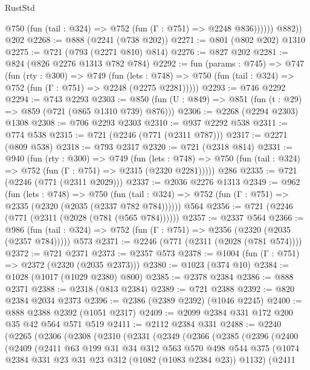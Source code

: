 \begin{lexlean}{RustStd}
\begin{coremodule}
{\begin{coremodule}
{{{{{{{{{{              @750 (fun (tail : @324) => @752 (fun (Γ : @751) => @2248 @836))))))
        @882))
    @202
@2268 := @888 (@2241 (@738 @202))
@2271 := @801 (@802 @202) @1310
@2275 := @721 (@793 (@2271 @810) @814)
@2276 := @827 @202
@2281 := @824 (@826 @2276 @1313 @782 @784)
@2292 := fun (params : @745) =>
  @747
    (fun (rty : @300) =>
    @749
      (fun (lets : @748) =>
      @750 (fun (tail : @324) => @752 (fun (Γ : @751) => @2248 (@2275 @2281)))))
@2293 := @746 @2292
@2294 := @743 @2293
@2303 := @850 (fun (U : @849) => @851 (fun (t : @29) => @859 (@721 (@865 @1310 @739) @876)))
@2306 := @2268 (@2294 @2303) @1308
@2308 := @706 @2293 @2303
@2310 := @937 @2292 @538
@2311 := @774 @538
@2315 := @721 (@2246 (@771 (@2311 @787)))
@2317 := @2271 (@809 @538)
@2318 := @793 @2317
@2320 := @721 (@2318 @814)
@2331 := @940
    (fun (rty : @300) =>
    @749
      (fun (lets : @748) =>
      @750 (fun (tail : @324) => @752 (fun (Γ : @751) => @2315 (@2320 @2281)))))
    @286
@2335 := @721 (@2246 (@771 (@2311 @2029)))
@2337 := @2036 @2276 @1313
@2349 := @962
    (fun (lets : @748) =>
    @750 (fun (tail : @324) => @752 (fun (Γ : @751) => @2335 (@2320 (@2035 (@2337 @782 @784))))))
    @564
@2356 := @721 (@2246 (@771 (@2311 (@2028 (@781 (@565 @784))))))
@2357 := @2337 @564
@2366 := @986
    (fun (tail : @324) => @752 (fun (Γ : @751) => @2356 (@2320 (@2035 (@2357 @784)))))
    @573
@2371 := @2246 (@771 (@2311 (@2028 (@781 @574))))
@2372 := @721 @2371
@2373 := @2357 @573
@2378 := @1004 (fun (Γ : @751) => @2372 (@2320 (@2035 @2373)))
@2380 := @1023 (@374 @10)
@2384 := @1028 (@1017 (@1029 @2380) @800)
@2385 := @2378 @2384
@2386 := @888 @2371
@2388 := @2318 (@813 @2384)
@2389 := @721 @2388
@2392 := @820 @2384 @2034 @2373
@2396 := @2386 (@2389 @2392) (@1046 @2245)
@2400 := @888 @2388 @2392 (@1051 @2317)
@2409 := @2099 @2384 @331 @172 @200 @35 @42 @564 @571 @519
@2411 := @2112 @2384 @331
@2488 := @2240
    (@2265
      (@2306
        (@2308
          (@2310
            (@2331
              (@2349
                (@2366
                  (@2385
                    (@2396
                      (@2400
                        (@2409
                          (@2411
                            @63
                            @199
                            @31
                            @34
                            @312
                            @563
                            @570
                            @498
                            @544
                            @375
                            (@1074 @2384 @331 @23 @31 @23 @312 (@1082 (@1083 @2384 @23)) @1132)
                            (@2411
}}}}}}}}}}
\end{coremodule}}
\end{coremodule}
\end{lexlean}
